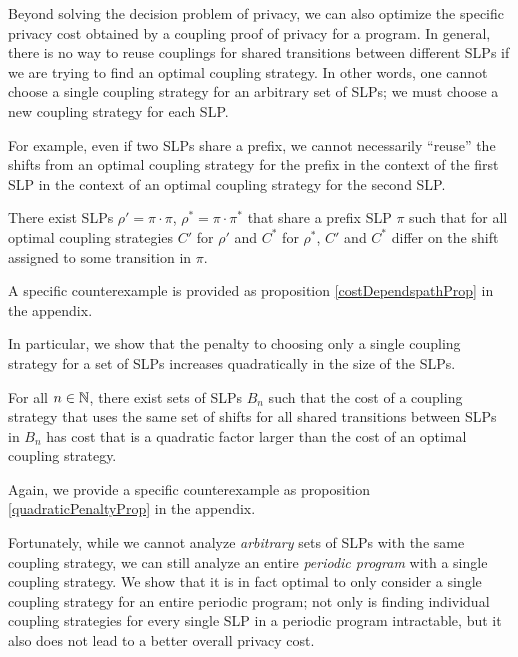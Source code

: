 
Beyond solving the decision problem of privacy, we can also optimize the specific privacy cost obtained by a coupling proof of privacy for a program. 
In general, there is no way to reuse couplings for shared transitions between different SLPs if we are trying to find an optimal coupling strategy. In other words, one cannot choose a single coupling strategy for an arbitrary set of SLPs; we must choose a new coupling strategy for each SLP.

For example, even if two SLPs share a prefix, we cannot necessarily ``reuse'' the shifts from an optimal coupling strategy for the prefix in the context of the first SLP in the context of an optimal coupling strategy for the second SLP. 

\begin{prop}\label{noSharingStrategiesProp}
  There exist SLPs $\rho'=\pi\cdot \pi$, $\rho^*=\pi\cdot\pi^*$ that share a prefix SLP $\pi$ such that for all optimal coupling strategies $C'$ for $\rho'$ and $C^*$ for $\rho^*$, $C'$ and $C^*$ differ on the shift assigned to some transition in $\pi$. 
\end{prop}

A specific counterexample is provided as proposition \ref{costDependspathProp} in the appendix. 

In particular, we show that the penalty to choosing only a single coupling strategy for a set of SLPs increases quadratically in the size of the SLPs.

\begin{prop}\label{quadraticPenaltyProp}
  For all $n\in \mathbb{N}$, there exist sets of SLPs $B_n$ such that the cost of a coupling strategy that uses the same set of shifts for all shared transitions between SLPs in $B_n$ has cost that is a quadratic factor larger than the cost of an optimal coupling strategy. 
\end{prop}

Again, we provide a specific counterexample as proposition \ref{quadraticPenaltyProp} in the appendix. 

Fortunately, while we cannot analyze \textit{arbitrary} sets of SLPs with the same coupling strategy, we can still analyze an entire \textit{periodic program} with a single coupling strategy.
We show that it is in fact optimal to only consider a single coupling strategy for an entire periodic program; not only is finding individual coupling strategies for every single SLP in a periodic program intractable, but it also does not lead to a better overall privacy cost. 

